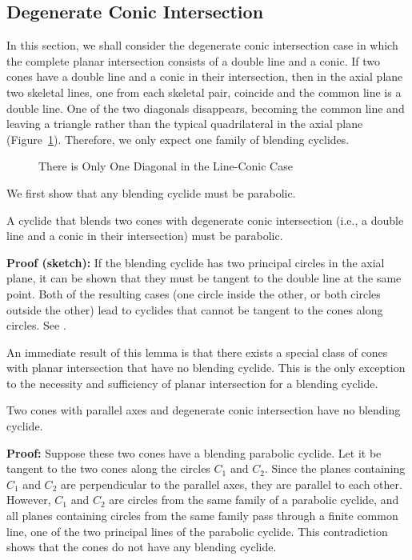 \subsection{Degenerate Conic Intersection}
\label{section:line-conic}

     In this section, we shall consider the degenerate conic intersection
case in which the 
complete planar intersection consists of a double line and a conic. 
If two cones have a double line and a conic in their intersection, then
in the axial plane two skeletal lines, one from each skeletal pair, coincide 
and the common line is a double line.  
One of the two diagonals disappears, 
becoming the common line and leaving a triangle rather than the typical
quadrilateral in the axial plane (Figure~\ref{fig:three-lines}).
Therefore, we only expect one family of blending cyclides.

\begin{figure}
\vspace{7.5cm}
\caption{There is Only One Diagonal in the Line-Conic Case}
\label{fig:three-lines}
\end{figure}

We first show that any blending cyclide must be parabolic.

\begin{lemma}
\label{lemma:only-one-family}
     A cyclide that blends two cones with degenerate conic
intersection (i.e., a double line and a conic in their intersection) must be
parabolic.
\end{lemma}
{\bf Proof (sketch):} 
If the blending cyclide has two principal circles in the axial plane,
it can be shown that they must be tangent to the double line at the same point.
Both of the resulting cases (one circle inside the other, or both circles
outside the other) lead to cyclides that 
cannot be tangent to the cones along circles.
See \cite[Lemma~5.17]{shenethesis}.
\QED

An immediate result of this lemma is that there exists a special
class of cones with planar intersection that have no blending cyclide.  This
is the only exception to the necessity and sufficiency of planar intersection
for a blending cyclide.

\begin{cor}
\label{cor:no-cyclide-at-all}
Two cones with parallel axes and degenerate conic intersection 
have no blending cyclide.
\end{cor}
{\bf Proof:}  Suppose these two cones have a blending parabolic 
cyclide.  Let it be tangent to the two cones along the circles $C_1$ and $C_2$.
Since the planes containing $C_1$ and $C_2$ are perpendicular
to the parallel axes, they are parallel to each other.
However, $C_1$ and $C_2$ are circles from the same family of a parabolic
cyclide, and all planes containing circles from the same family pass through
a finite common line, one of the two principal lines of the parabolic cyclide.
This contradiction shows that the cones do not have any blending cyclide. \QED

